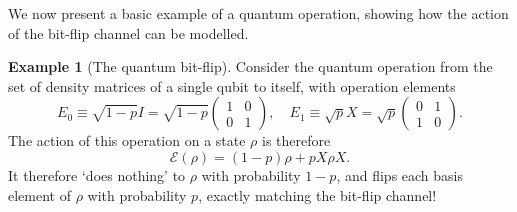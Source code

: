 \documentclass[12pt,a4paper]{report}
\numberwithin{equation}{section}
\theoremstyle{definition}
\theoremstyle{theorem}
\theoremstyle{theorem}
\theoremstyle{example}
\newtheorem{example}{Example}[section]
\theoremstyle{definition}
\begin{document}
We now present a basic example of a quantum operation, showing how the action of the bit-flip channel can be modelled.
\begin{example}[The quantum bit-flip]
	Consider the quantum operation from the set of density matrices of a single qubit to itself, with operation elements
	\begin{equation}
		E_{0}\equiv\sqrt{1-p}I=\sqrt{1-p}\begin{pmatrix}
			1&0\\0&1
		\end{pmatrix},\quad E_{1}\equiv\sqrt{p}X=\sqrt{p}\begin{pmatrix}
		0&1\\1&0
	\end{pmatrix}.
	\end{equation}
	The action of this operation on a state $\rho$ is therefore 
	\begin{equation}
		\mathcal{E}(\rho)=(1-p)\rho+pX\rho X.
	\end{equation}
	It therefore `does nothing' to $\rho$ with probability $1-p$, and flips each basis element of $\rho$ with probability $p$, exactly matching the bit-flip channel!
\end{example}
\end{document}
